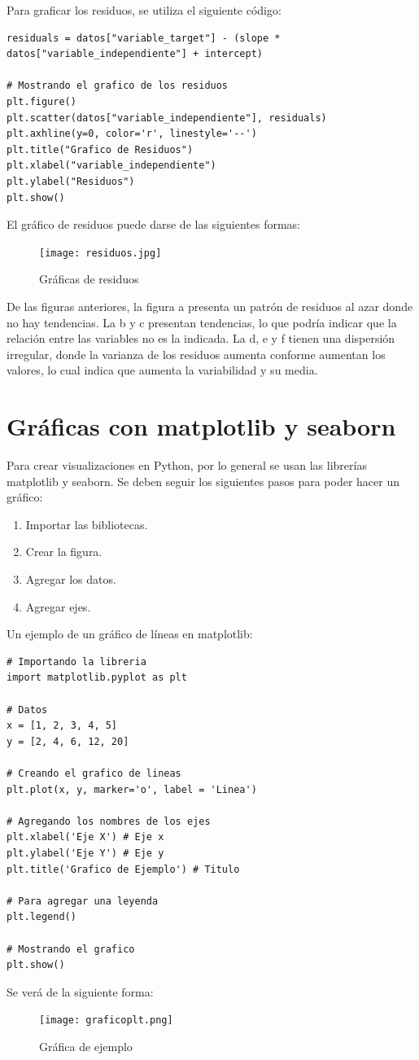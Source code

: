 \documentclass[a4paper, 12pt]{book}
\begin{document}
Para graficar los residuos, se utiliza el siguiente código:
\begin{verbatim}
residuals = datos["variable_target"] - (slope * datos["variable_independiente"] + intercept)

# Mostrando el grafico de los residuos
plt.figure()
plt.scatter(datos["variable_independiente"], residuals)
plt.axhline(y=0, color='r', linestyle='--')
plt.title("Grafico de Residuos")
plt.xlabel("variable_independiente")
plt.ylabel("Residuos")
plt.show()
\end{verbatim}
El gráfico de residuos puede darse de las siguientes formas:
\begin{figure}[H] 
	\centering 
	\texttt{[image: residuos.jpg]}
	\caption{Gráficas de residuos}
\end{figure}
De las figuras anteriores, la figura a presenta un patrón de residuos al azar donde no hay tendencias. La b y c presentan tendencias, lo que podría indicar que la relación entre las variables no es la indicada. La d, e y f tienen una dispersión irregular, donde la varianza de los residuos aumenta conforme aumentan los valores, lo cual indica que aumenta la variabilidad y su media.

\section{Gráficas con matplotlib y seaborn}
Para crear visualizaciones en Python, por lo general se usan las librerías matplotlib y seaborn. Se deben seguir los siguientes pasos para poder hacer un gráfico:
\begin{enumerate}
	\item Importar las bibliotecas.
	\item Crear la figura.
	\item Agregar los datos.
	\item Agregar ejes.
\end{enumerate}
Un ejemplo de un gráfico de líneas en matplotlib:

\begin{verbatim}
# Importando la libreria
import matplotlib.pyplot as plt
	
# Datos
x = [1, 2, 3, 4, 5]
y = [2, 4, 6, 12, 20]
	
# Creando el grafico de lineas
plt.plot(x, y, marker='o', label = 'Linea')
	
# Agregando los nombres de los ejes
plt.xlabel('Eje X') # Eje x
plt.ylabel('Eje Y') # Eje y
plt.title('Grafico de Ejemplo') # Titulo
	
# Para agregar una leyenda
plt.legend()
	
# Mostrando el grafico
plt.show()
\end{verbatim}
Se verá de la siguiente forma:
\begin{figure}[H] 
	\centering 
	\texttt{[image: graficoplt.png]}
	\caption{Gráfica de ejemplo}
\end{figure}
\end{document}
